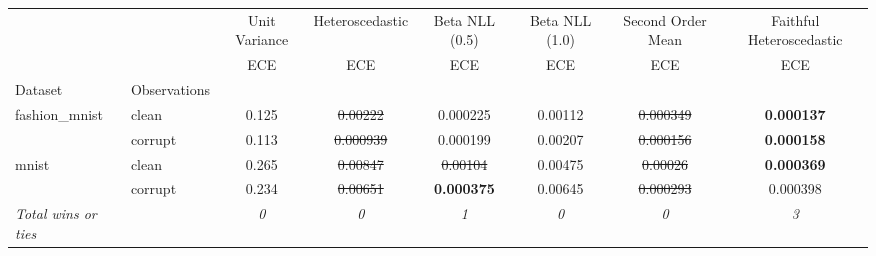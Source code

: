 \begin{tabular}{ll|c|c|c|c|c|c}
\toprule
{} & {} & {Unit Variance} & {Heteroscedastic} & {Beta NLL (0.5)} & {Beta NLL (1.0)} & {Second Order Mean} & {Faithful Heteroscedastic} \\
{} & {} & {ECE} & {ECE} & {ECE} & {ECE} & {ECE} & {ECE} \\
{Dataset} & {Observations} & {} & {} & {} & {} & {} & {} \\
\midrule
\multirow[t]{2}{*}{fashion_mnist} & clean & 0.125 & \sout{0.00222} & 0.000225 & 0.00112 & \sout{0.000349} & \textbf{0.000137} \\
 & corrupt & 0.113 & \sout{0.000939} & 0.000199 & 0.00207 & \sout{0.000156} & \textbf{0.000158} \\
\multirow[t]{2}{*}{mnist} & clean & 0.265 & \sout{0.00847} & \sout{0.00104} & 0.00475 & \sout{0.00026} & \textbf{0.000369} \\
 & corrupt & 0.234 & \sout{0.00651} & \textbf{0.000375} & 0.00645 & \sout{0.000293} & 0.000398 \\
\textit{{Total wins or ties}} &  & \textit{0} & \textit{0} & \textit{1} & \textit{0} & \textit{0} & \textit{3} \\
\bottomrule
\end{tabular}

